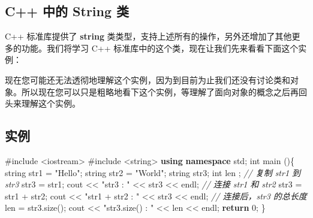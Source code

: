 \documentclass[
]{article}
\newenvironment{Shaded}{}{}
\newcommand{\CommentTok}[1]{\textcolor[rgb]{0.38,0.63,0.69}{\textit{#1}}}
\newcommand{\ControlFlowTok}[1]{\textcolor[rgb]{0.00,0.44,0.13}{\textbf{#1}}}
\newcommand{\DataTypeTok}[1]{\textcolor[rgb]{0.56,0.13,0.00}{#1}}
\newcommand{\DecValTok}[1]{\textcolor[rgb]{0.25,0.63,0.44}{#1}}
\newcommand{\ImportTok}[1]{#1}
\newcommand{\KeywordTok}[1]{\textcolor[rgb]{0.00,0.44,0.13}{\textbf{#1}}}
\newcommand{\NormalTok}[1]{#1}
\newcommand{\OperatorTok}[1]{\textcolor[rgb]{0.40,0.40,0.40}{#1}}
\newcommand{\PreprocessorTok}[1]{\textcolor[rgb]{0.74,0.48,0.00}{#1}}
\newcommand{\StringTok}[1]{\textcolor[rgb]{0.25,0.44,0.63}{#1}}
\begin{document}
\hypertarget{c-ux4e2dux7684-string-ux7c7b}{%
\subsection{C++ 中的 String 类}\label{c-ux4e2dux7684-string-ux7c7b}}

C++ 标准库提供了 \textbf{string}
类类型，支持上述所有的操作，另外还增加了其他更多的功能。我们将学习 C++
标准库中的这个类，现在让我们先来看看下面这个实例：

现在您可能还无法透彻地理解这个实例，因为到目前为止我们还没有讨论类和对象。所以现在您可以只是粗略地看下这个实例，等理解了面向对象的概念之后再回头来理解这个实例。

\hypertarget{ux5b9eux4f8b-14}{%
\subsection{实例}\label{ux5b9eux4f8b-14}}

\begin{Shaded}
\begin{Highlighting}[]
\PreprocessorTok{\#include }\ImportTok{\textless{}iostream\textgreater{}}
\PreprocessorTok{\#include }\ImportTok{\textless{}string\textgreater{}}
\KeywordTok{using} \KeywordTok{namespace}\NormalTok{ std}\OperatorTok{;} 
\DataTypeTok{int}\NormalTok{ main }\OperatorTok{()\{}
\NormalTok{   string str1 }\OperatorTok{=} \StringTok{"Hello"}\OperatorTok{;}   
\NormalTok{   string str2 }\OperatorTok{=} \StringTok{"World"}\OperatorTok{;}   
\NormalTok{   string str3}\OperatorTok{;}   
   \DataTypeTok{int}\NormalTok{  len }\OperatorTok{;} 
   \CommentTok{// 复制 str1 到 str3}
\NormalTok{   str3 }\OperatorTok{=}\NormalTok{ str1}\OperatorTok{;}   
\NormalTok{   cout }\OperatorTok{\textless{}\textless{}} \StringTok{"str3 : "} \OperatorTok{\textless{}\textless{}}\NormalTok{ str3 }\OperatorTok{\textless{}\textless{}}\NormalTok{ endl}\OperatorTok{;} 
   \CommentTok{// 连接 str1 和 str2}
\NormalTok{   str3 }\OperatorTok{=}\NormalTok{ str1 }\OperatorTok{+}\NormalTok{ str2}\OperatorTok{;}   
\NormalTok{   cout }\OperatorTok{\textless{}\textless{}} \StringTok{"str1 + str2 : "} \OperatorTok{\textless{}\textless{}}\NormalTok{ str3 }\OperatorTok{\textless{}\textless{}}\NormalTok{ endl}\OperatorTok{;} 
   \CommentTok{// 连接后，str3 的总长度}
\NormalTok{   len }\OperatorTok{=}\NormalTok{ str3}\OperatorTok{.}\NormalTok{size}\OperatorTok{();}   
\NormalTok{   cout }\OperatorTok{\textless{}\textless{}} \StringTok{"str3.size() :  "} \OperatorTok{\textless{}\textless{}}\NormalTok{ len }\OperatorTok{\textless{}\textless{}}\NormalTok{ endl}\OperatorTok{;} 
   \ControlFlowTok{return} \DecValTok{0}\OperatorTok{;}
\OperatorTok{\}}
\end{Highlighting}
\end{Shaded}
\end{document}
